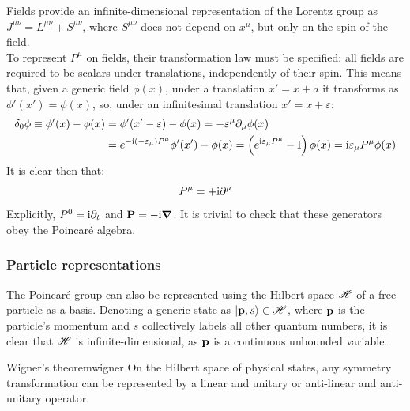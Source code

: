 Fields provide an infinite-dimensional representation of the Lorentz group as $ J^{\mu \nu} = L^{\mu \nu} + S^{\mu \nu} $, where $ S^{\mu \nu} $ does not depend on $ x^\mu $, but only on the spin of the field.\\
To represent $ P^\mu $ on fields, their transformation law must be specified: all fields are required to be scalars under translations, independently of their spin. This means that, given a generic field $ \phi(x) $, under a translation $ x' = x + a $ it transforms as $ \phi'(x') = \phi(x) $, so, under an infinitesimal translation $ x' = x + \varepsilon $:
\begin{equation*}
  \begin{split}
    \delta_0 \phi \equiv \phi'(x) - \phi(x)
    &= \phi'(x' - \varepsilon) - \phi(x) = - \varepsilon^\mu \partial_\mu \phi(x) \\
    &= e^{-\mathrm{i} (-\varepsilon_\mu) P^\mu} \phi'(x') - \phi(x) = \left( e^{\mathrm{i} \varepsilon_\mu P^\mu} - \mathrm{I} \right) \phi(x) = \mathrm{i} \varepsilon_\mu P^\mu \phi(x)
  \end{split}
\end{equation*}
It is clear then that:
\begin{equation}
  P^\mu = +\mathrm{i} \partial^\mu
\end{equation}
Explicitly, $ P^0 = \mathrm{i} \partial_t $ and $ \mathbf{P} = - \mathrm{i} \boldsymbol{\nabla} $. It is trivial to check that these generators obey the Poincaré algebra.

\subsubsection{Particle representations}

The Poincaré group can also be represented using the Hilbert space $ \mathscr{H} $ of a free particle as a basis. Denoting a generic state as $ \ket{\mathbf{p},s} \in \mathscr{H} $, where $ \mathbf{p} $ is the particle's momentum and $ s $ collectively labels all other quantum numbers, it is clear that $ \mathscr{H} $ is infinite-dimensional, as $ \mathbf{p} $ is a continuous unbounded variable.

\begin{theorem}{Wigner's theorem}{wigner}
  On the Hilbert space of physical states, any symmetry transformation can be represented by a linear and unitary or anti-linear and anti-unitary operator.
\end{theorem}

